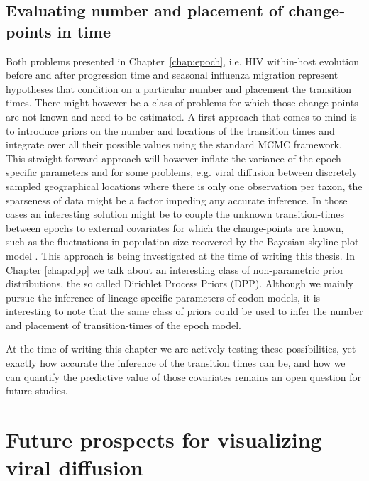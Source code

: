 \subsection{Evaluating number and placement of change-points in time}

Both problems presented in Chapter~\ref{chap:epoch}, i.e. HIV within-host evolution before and after progression time and seasonal influenza migration represent hypotheses that condition on a particular  number and placement the transition times.
There might however be a class of problems for which those change points are not known and need to be estimated.
A first approach that comes to mind is to introduce priors on the number and locations of the transition times and integrate over all their possible values using the standard MCMC framework.
This straight-forward approach will however inflate the variance of the epoch-specific parameters and for some problems, e.g. viral diffusion between discretely sampled geographical locations where there is only one observation per taxon, the sparseness of data might be a factor impeding any accurate inference.
In those cases an interesting solution might be to couple the unknown transition-times between epochs to external covariates for which the change-points are known, such as  the fluctuations in population size recovered by the Bayesian skyline plot model \citep{Drummond2005}.
This approach is being investigated at the time of writing this thesis. %
In Chapter \ref{chap:dpp} we talk about an interesting class of non-parametric prior distributions, the so called Dirichlet Process Priors (DPP). 
Although we mainly pursue the inference of lineage-specific parameters of codon models, it is interesting to note that the same class of priors could be used to infer the number and placement of transition-times of the epoch model.

At the time of writing this chapter we are actively testing these possibilities, yet exactly how accurate the inference of the transition times can be, and how we can quantify the predictive value of those covariates remains an open question for future studies.

\section{Future prospects for visualizing viral diffusion}

